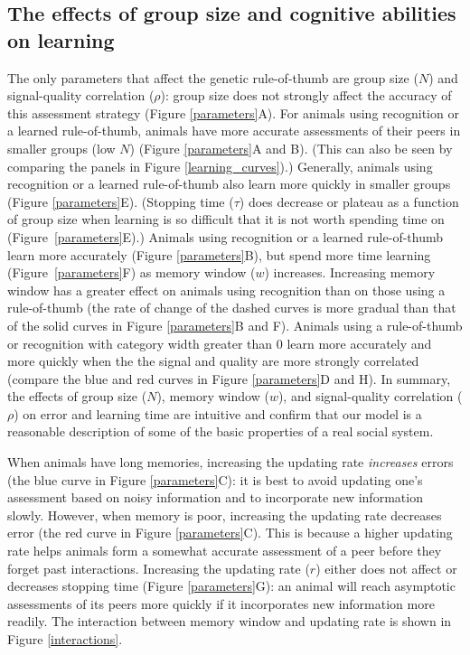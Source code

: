 \subsection*{The effects of group size and cognitive abilities on learning}
The only parameters that affect the genetic rule-of-thumb are group size ($N$) and signal-quality correlation ($\rho$): group size does not strongly affect the accuracy of this assessment strategy (Figure \ref{parameters}A). For animals using recognition or a learned rule-of-thumb, animals have more accurate assessments of their peers in smaller groups (low $N$) (Figure \ref{parameters}A and B). (This can also be seen by comparing the panels in Figure \ref{learning_curves}).) Generally, animals using recognition or a learned rule-of-thumb also learn more quickly in smaller groups (Figure \ref{parameters}E). (Stopping time ($\tau$) does decrease or plateau as a function of group size when learning is so difficult that it is not worth spending time on (Figure~\ref{parameters}E).) Animals using recognition or a learned rule-of-thumb learn more accurately (Figure \ref{parameters}B), but spend more time learning (Figure~\ref{parameters}F) as memory window ($w$) increases. Increasing memory window has a greater effect on animals using recognition than on those using a rule-of-thumb (the rate of change of the dashed curves is more gradual than that of the solid curves in Figure \ref{parameters}B and F).  Animals using a rule-of-thumb or recognition with category width greater than $0$ learn more accurately and more quickly when the the signal and quality are more strongly correlated (compare the blue and red curves in Figure \ref{parameters}D and H). In summary, the effects of group size ($N$), memory window ($w$), and signal-quality correlation ($\rho$) on error and learning time are intuitive and confirm that our model is a reasonable description of some of the basic properties of a real social system. 
 
When animals have long memories, increasing the updating rate \emph{increases} errors (the blue curve in Figure \ref{parameters}C): it is best to avoid updating one's assessment based on noisy information and to incorporate new information slowly. However, when memory is poor, increasing the updating rate decreases error (the red curve in Figure \ref{parameters}C). This is because a higher updating rate helps animals form a somewhat accurate assessment of a peer before they forget past interactions. Increasing the updating rate ($r$) either does not affect or decreases stopping time  (Figure \ref{parameters}G): an animal will reach asymptotic assessments of its peers more quickly if it incorporates new information more readily. The interaction between memory window and updating rate is shown in Figure \ref{interactions}.
 
